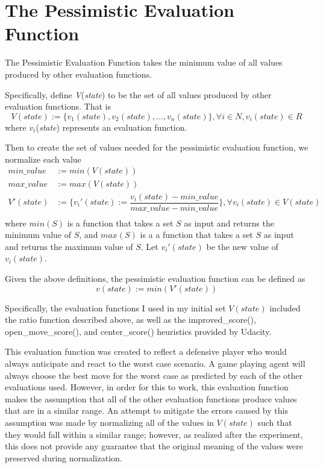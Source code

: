 \documentclass[12pt]{article}
\begin{document}
\section{The Pessimistic Evaluation Function}
The Pessimistic Evaluation Function takes the minimum value of all values 
produced by other evaluation functions.

Specifically, define \textit{V}(\textit{state}) to be the set of all values 
produced by other evaluation functions. That is
\begin{equation*}
V(state) := \{v_1(state), v_2(state), ..., v_n(state)\}, \forall i \in N, 
v_i(state) \in R
\end{equation*} where $v_i$(\textit{state}) represents an evaluation function.

Then to create the set of values needed for the pessimistic evaluation function, 
we normalize each value 
\begin{equation*}
	\begin{split}
		min\_value &:= min(V(state))\\
		max\_value &:= max(V(state))\\
		V'(state) &:= \{v_i'(state) := \dfrac{v_i(state) - min\_value}{max\_value - 
min\_value}\}, \forall v_i(state) \in V(state)\\
	\end{split}
\end{equation*}
where $min(S)$ is a function that takes a set $S$ as input and returns the 
minimum value of $S$, and $max(S)$ is a a function that takes a set $S$ as input 
and returns the maximum value of $S$. Let $v_i'(state)$ be the new value of 
$v_i(state)$.

Given the above definitions, the pessimistic evaluation function can be defined 
as
\begin{equation*}
v(state) := min(V'(state))
\end{equation*}

Specifically, the evaluation functions I used in my initial set $V(state)$ 
included the ratio function described above, as well as the improved\_score(), 
open\_move\_score(), and center\_score() heuristics provided by Udacity.

This evaluation function was created to reflect a defensive player who would 
always anticipate and react to the worst case scenario. A game playing agent 
will always choose the best move for the worst case as predicted by each of the 
other evaluations used. However, in order for this to work, this evaluation 
function makes the assumption that all of the other evaluation functions produce 
values that are in a similar range. An attempt to mitigate the errors caused by 
this assumption was made by normalizing all of the values in $V(state)$ such 
that they would fall within a similar range; however, as realized after the 
experiment, this does not provide any guarantee that the original meaning of the 
values were preserved during normalization.
\end{document}
